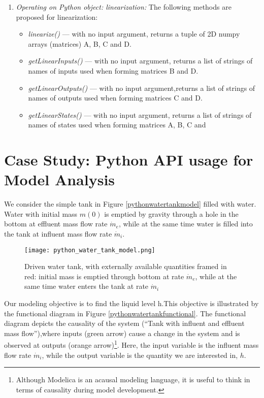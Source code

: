 \begin{enumerate}
	\item \textit{Operating on Python object: linearization:} The following methods are proposed for linearization:
	\begin{itemize}
		\item \textit{linearize()} — with no input argument, returns a tuple of 2D numpy arrays (matrices) A, B, C and D.
		\item \textit{getLinearInputs()} — with no input argument, returns a list of strings of names of inputs used when forming matrices B and D.
		\item \textit{getLinearOutputs()} — with no input argument,returns a list of strings of names of outputs used when forming matrices C and D.
		\item \textit{getLinearStates()} — with no input argument, returns a list of strings of names of states used when forming matrices A, B, C and
	\end{itemize}
\end{enumerate}

\section{Case Study: Python API usage for Model Analysis}
\label{subsec:pythoncasestudy}

We consider the simple tank in Figure \ref{pythonwatertankmodel} filled with water. Water with initial mass $m(0)$ is emptied by gravity
through a hole in the bottom at effluent mass flow rate $\dot{m}_e$, while at the same time water is filled into the tank at influent mass flow rate $\dot{m}_i$.

\begin{figure}
	\texttt{[image: python\_water\_tank\_model.png]}
	\caption{Driven water tank, with externally available quantities framed	in red: initial mass is emptied through bottom at rate $\dot{m}_e $, while at the same time water enters the tank at rate $\dot{m}_i$ }
	\label{fig:pythonwatertankmodel}
\end{figure}

Our modeling objective is to find the liquid level h.This objective is illustrated by the functional diagram in
Figure \ref{pythonwatertankfunctional}. The functional diagram depicts the causality of the system (“Tank with influent and effluent mass flow”),where inputs (green arrow) cause a change in the system and is observed at outputs (orange arrow)\footnote{Although Modelica is an acausal modeling language, it is useful to think in terms of causality during model development.}. Here, the input variable is the influent mass flow rate $\dot{m}_i$, while the
output variable is the quantity we are interested in, $h$.

